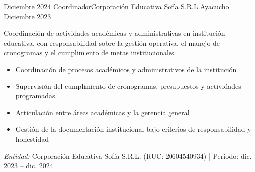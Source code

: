\experience
{Diciembre 2024} {Coordinador}{Corporación Educativa Sofía S.R.L.}{Ayacucho}
{Diciembre 2023} {
	Coordinación de actividades académicas y administrativas en institución educativa, con responsabilidad sobre la gestión operativa, el manejo de cronogramas y el cumplimiento de metas institucionales.
	\begin{itemize}
		\item Coordinación de procesos académicos y administrativos de la institución
		\item Supervisión del cumplimiento de cronogramas, presupuestos y actividades programadas
		\item Articulación entre áreas académicas y la gerencia general
		\item Gestión de la documentación institucional bajo criterios de responsabilidad y honestidad
	\end{itemize}
}
{\footnotesize{\emph{Entidad:} Corporación Educativa Sofía S.R.L. (RUC: 20604540934) | Período: dic. 2023 -- dic. 2024}}
